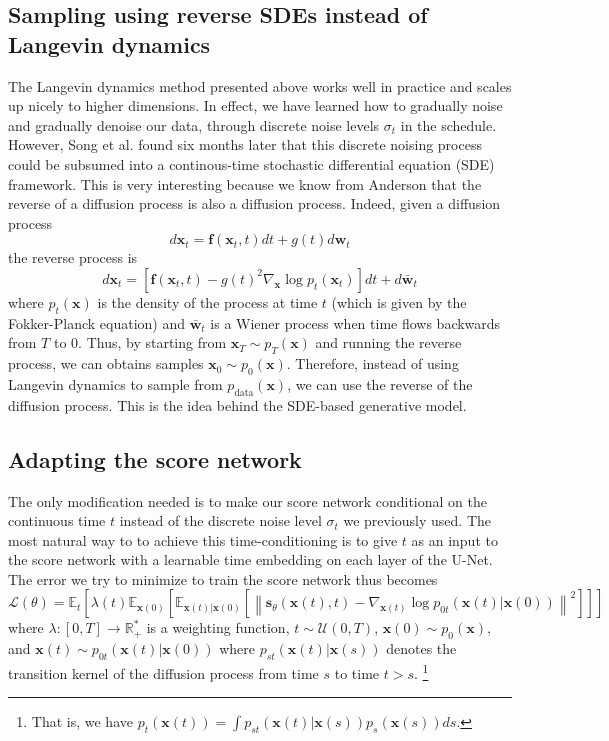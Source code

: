 \documentclass{article}
\begin{document}
\subsection{Sampling using reverse SDEs instead of Langevin dynamics}
The Langevin dynamics method presented above works well in practice and scales up nicely to higher dimensions. In effect, we have learned how to gradually noise and gradually 
denoise our data, through discrete noise levels $\sigma_t$ in the schedule.
However, Song et al. found six months later that this discrete noising process could be subsumed into a continous-time stochastic differential equation (SDE) framework. This is
very interesting because we know from Anderson \cite{anderson} that the reverse of a diffusion process is also a diffusion process. Indeed, given a diffusion process
\begin{equation}
    d\mathbf{x}_t = \mathbf{f}(\mathbf{x}_t,t)dt + g(t)d\mathbf{w}_t
\end{equation}
the reverse process is
\begin{equation}
    d\mathbf{x}_t = \left[ \mathbf{f}(\mathbf{x}_t,t) - g(t)^2 \nabla_\mathbf{x} \log p_t(\mathbf{x}_t) \right]dt + d\mathbf{\bar{w}}_t
\end{equation}
where $p_t(\mathbf{x})$ is the density of the process at time $t$ (which is given by the Fokker-Planck equation) and $\mathbf{\bar{w}}_t$ is a Wiener process when time flows backwards from $T$ to $0$.
Thus, by starting from $\mathbf{x}_T \sim p_T(\mathbf{x})$ and running the reverse process, we can obtains samples $\mathbf{x}_0 \sim p_0(\mathbf{x})$.
Therefore, instead of using Langevin dynamics to sample from $p_\text{data}(\mathbf{x})$, we can use the reverse of the diffusion process. This is the idea behind the SDE-based generative model.

\subsection{Adapting the score network}
The only modification needed is to make our score network conditional on the continuous time $t$ instead of the discrete noise level $\sigma_t$ we previously used. The most natural 
way to to achieve this time-conditioning is to give $t$ as an input to the score network with a learnable time embedding on each layer of the U-Net. The error we try to minimize to train 
the score network thus becomes
\begin{equation}
    \label{eq:score-sde}
    \mathcal{L}(\theta) = \mathbb{E}_t \left[ \lambda(t) \mathbb{E}_{\mathbf{x}(0)} \left[ \mathbb{E}_{\mathbf{x}(t)| \mathbf{x}(0)} \left[ \left\| \mathbf{s}_\theta(\mathbf{x}(t), t) - \nabla_{\mathbf{x}(t)} \log p_{0t}(\mathbf{x}(t)|\mathbf{x}(0)) \right\|^2 \right] \right] \right]
\end{equation}
where $\lambda : [0,T] \to \mathbb{R}_+^*$ is a weighting function, $t\sim \mathcal{U}(0,T)$, $\mathbf{x}(0) \sim p_0(\mathbf{x})$, and 
$\mathbf{x}(t) \sim p_{0t}(\mathbf{x}(t)|\mathbf{x}(0))$ where $p_{st}(\mathbf{x}(t)|\mathbf{x}(s))$ denotes the transition kernel of the diffusion process from time $s$ to time $t>s$.
\footnote{That is, we have $p_t(\mathbf{x}(t)) = \int p_{st}(\mathbf{x}(t)|\mathbf{x}(s))p_s(\mathbf{x}(s))ds$.}
\end{document}
